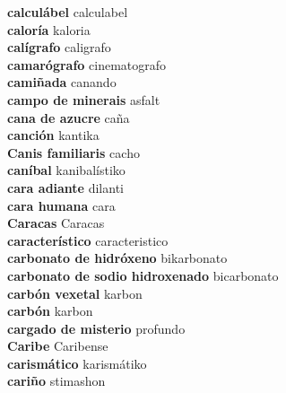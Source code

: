 \textbf{ calculábel  } calculabel \\
\textbf{ caloría  } kaloria \\
\textbf{ calígrafo  } caligrafo \\
\textbf{ camarógrafo  } cinematografo \\
\textbf{ camiñada  } canando \\
\textbf{ campo de minerais  } asfalt \\
\textbf{ cana de azucre  } caña \\
\textbf{ canción  } kantika \\
\textbf{ Canis familiaris  } cacho \\
\textbf{ caníbal  } kanibalístiko \\
\textbf{ cara adiante  } dilanti \\
\textbf{ cara humana  } cara \\
\textbf{ Caracas  } Caracas \\
\textbf{ característico  } caracteristico \\
\textbf{ carbonato de hidróxeno  } bikarbonato \\
\textbf{ carbonato de sodio hidroxenado  } bicarbonato \\
\textbf{ carbón vexetal  } karbon \\
\textbf{ carbón  } karbon \\
\textbf{ cargado de misterio  } profundo \\
\textbf{ Caribe  } Caribense \\
\textbf{ carismático  } karismátiko \\
\textbf{ cariño  } stimashon \\
